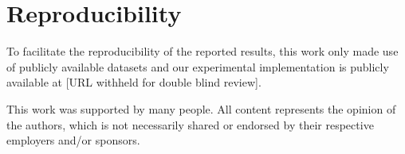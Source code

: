\documentclass[sigconf,natbib,screen=true,review=true,anonymous]{acmart}
\begin{document}
\maketitle

\acresetall

\setlength{\belowdisplayskip}{0.5\baselineskip} \setlength{\belowdisplayshortskip}{0.5\baselineskip}
\setlength{\abovedisplayskip}{0.5\baselineskip} \setlength{\abovedisplayshortskip}{0.5\baselineskip}









\section*{Reproducibility}
To facilitate the reproducibility of the reported results, this work only made use of publicly available datasets and our experimental implementation is publicly available at [URL withheld for double blind review].

\begin{acks}
 This work was supported by many people.
 All content represents the opinion of the authors, which is not necessarily shared or endorsed by their respective employers and/or sponsors.
\end{acks}



\end{document}

